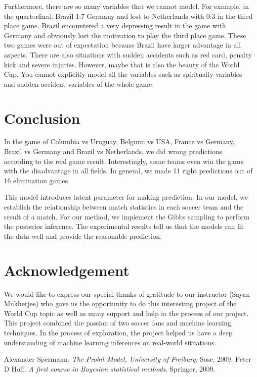 \documentclass{article}
\begin{document}
Furthermore, there are so many variables that we cannot model. For example, in the quarterfinal, Brazil 1:7 Germany and lost to Netherlands with 0:3 in the third place game. Brazil encountered a very depressing result in the game with Germany and obviously lost the motivation to play the third place game. These two games were out of expectation because Brazil have larger advantage in all aspects. There are also situations with sudden accidents such as red card, penalty kick and severe injuries. However, maybe that is also the beauty of the World Cup. You cannot explicitly model all the variables such as spiritually variables and sudden accident variables of the whole game.

\section{Conclusion}

In the game of Columbia vs Uruguay, Belgium vs USA, France vs Germany, Brazil vs Germany and Brazil vs Netherlands, we did wrong predictions according to the real game result. Interestingly, some teams even win the game with the disadvantage in all fields. In general, we made 11 right predictions out of 16 elimination games. 

This model introduces latent parameter for making prediction. In our model, we establish the relationship between match statistics in each soccer team and the result of a match. For our method, we implement the Gibbs sampling to perform the posterior inference. The experimental results tell us that the models can fit the data well and provide the reasonable prediction.

\section{Acknowledgement}

We would like to express our special thanks of gratitude to our instructor (Sayan Mukherjee) who gave us the opportunity to do this interesting project of the World Cup topic as well as many support and help in the process of our project. This project combined the passion of two soccer fans and machine learning techniques. In the process of exploration, the project helped us have a deep understanding of machine learning inferences on real-world situations. 

\begin{thebibliography}{99}
 Alexander Spermann. \textit{The Probit Model, University of Freiburg}. Sose, 2009.
 Peter D Hoff. \textit{A first course in Bayesian statistical methods}. Springer, 2009.
\end{thebibliography}
\end{document}
